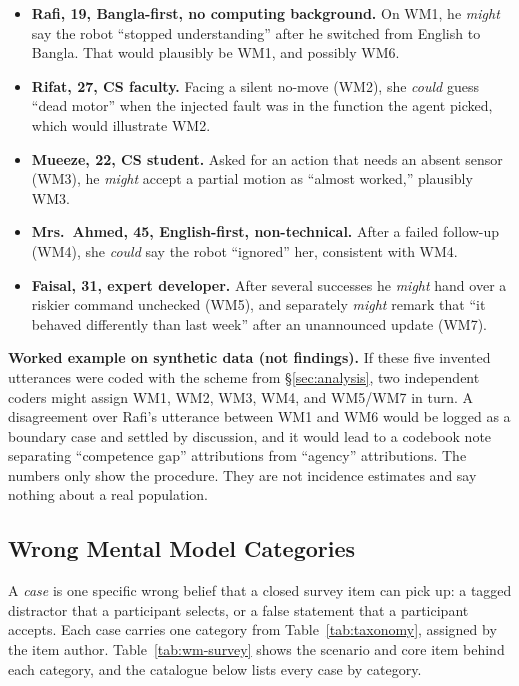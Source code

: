 \documentclass[sigconf]{acmart}
\begin{document}
\begin{itemize}
  \item \textbf{Rafi, 19, Bangla-first, no computing background.} On WM1, he \emph{might} say the robot ``stopped understanding'' after he switched from English to Bangla. That would plausibly be WM1, and possibly WM6.
  \item \textbf{Rifat, 27, CS faculty.} Facing a silent no-move (WM2), she \emph{could} guess ``dead motor'' when the injected fault was in the function the agent picked, which would illustrate WM2.
  \item \textbf{Mueeze, 22, CS student.} Asked for an action that needs an absent sensor (WM3), he \emph{might} accept a partial motion as ``almost worked,'' plausibly WM3.
  \item \textbf{Mrs.\ Ahmed, 45, English-first, non-technical.} After a failed follow-up (WM4), she \emph{could} say the robot ``ignored'' her, consistent with WM4.
  \item \textbf{Faisal, 31, expert developer.} After several successes he \emph{might} hand over a riskier command unchecked (WM5), and separately \emph{might} remark that ``it behaved differently than last week'' after an unannounced update (WM7).
\end{itemize}

\noindent\textbf{Worked example on synthetic data (not findings).} If these five invented utterances were coded with the scheme from \S\ref{sec:analysis}, two independent coders might assign WM1, WM2, WM3, WM4, and WM5/WM7 in turn. A disagreement over Rafi's utterance between WM1 and WM6 would be logged as a boundary case and settled by discussion, and it would lead to a codebook note separating ``competence gap'' attributions from ``agency'' attributions. The numbers only show the procedure. They are not incidence estimates and say nothing about a real population.

\subsection{Wrong Mental Model Categories}\label{sec:cases}
A \emph{case} is one specific wrong belief that a closed survey item can pick up: a tagged distractor that a participant selects, or a false statement that a participant accepts. Each case carries one category from Table~\ref{tab:taxonomy}, assigned by the item author. Table~\ref{tab:wm-survey} shows the scenario and core item behind each category, and the catalogue below lists every case by category.
\end{document}
